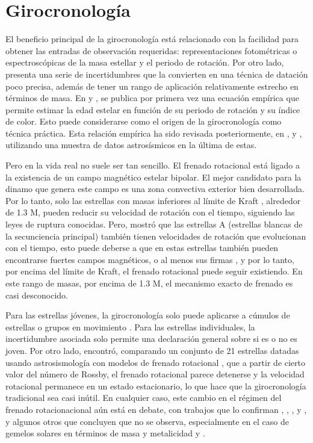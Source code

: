 \section{Girocronología}
El beneficio principal de la girocronología está relacionado con la facilidad para obtener las entradas de observación requeridas: representaciones fotométricas o espectroscópicas de la masa estellar y el periodo de rotación. Por otro lado, presenta una serie de incertidumbres que la convierten en una técnica de datación poco precisa, además de tener un rango de aplicación relativamente estrecho en términos de masa. En \cite{Barnes03} y \cite{Barnes07}, se publica por primera vez una ecuación empírica que permite estimar la edad estelar en función de su periodo de rotación y su índice de color. Esto puede considerarse como el origen de la girocronología como técnica práctica. Esta relación empírica ha sido revisada posteriormente, en \cite{MH}, \cite{Barnes10} y \cite{Angus15}, utilizando una muestra de datos astrosísmicos en la última de estas. 

Pero en la vida real no suele ser tan sencillo. El frenado rotacional está ligado a la existencia de un campo magnético estelar bipolar. El mejor candidato para la dinamo que genera este campo es una zona convectiva exterior bien desarrollada. Por lo tanto, solo las estrellas con masas inferiores al límite de Kraft \cite{Kraft67}, alrededor de 1.3 M, pueden reducir su velocidad de rotación con el tiempo, siguiendo las leyes de ruptura conocidas. Pero, \cite{Zorec12} mostró que las estrellas A (estrellas blancas de la secunciencia principal) también tienen velocidades de rotación que evolucionan con el tiempo, esto puede deberse a que en estas estrellas también pueden encontrarse fuertes campos magnéticos, o al menos sus firmas \cite{Balona17}, y por lo tanto, por encima del límite de Kraft, el frenado rotacional puede seguir existiendo. En este rango de masas, por encima de 1.3 M, el mecanismo exacto de frenado es casi desconocido.

Para las estrellas jóvenes, la girocronología solo puede aplicarse a cúmulos de estrellas o grupos en movimiento \cite{Curtis19}. Para las estrellas individuales, la incertidumbre asociada solo permite una declaración general sobre si es o no es joven. Por otro lado, \cite{Saders16} encontró, comparando un conjunto de 21 estrellas datadas usando astrosismología con modelos de frenado rotacional \cite{Saders13}, que a partir de cierto valor del número de Rossby, el frenado rotacional parece detenerse y la velocidad rotacional permanece en un estado estacionario, lo que hace que la girocronología tradicional sea casi inútil. En cualquier caso, este cambio en el régimen del frenado rotacionacional aún está en debate, con trabajos que lo confirman \cite{Gordon21}, \cite{Kitchatinov17}, \cite{Metcalfe19}, \cite{Metcalfe17} y \cite{Saders19}, y algunos otros que concluyen que no se observa, especialmente en el caso de gemelos solares en términos de masa y metalicidad \cite{Barnes16} y \cite{Oliveira19}.

